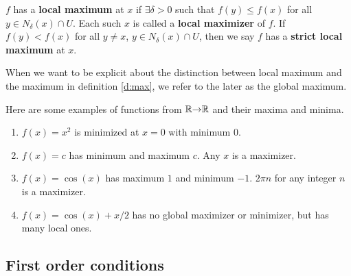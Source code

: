 \begin{definition}\label{d:lmax}
  $f$ has a \textbf{local maximum} at $x$ if $\exists \delta > 0$ such
  that $f(y) \leq f(x)$ for all $y \in  N_\delta(x) \cap U$. Each such
  $x$ is called a \textbf{local maximizer} of $f$. If $f(y) < f(x)$
  for all $y \neq x$, $y \in N_\delta(x) \cap U$, then we say $f$ has
  a \textbf{strict local maximum} at $x$.
\end{definition}
When we want to be explicit about the distinction between local
maximum and the maximum in definition \ref{d:max}, we refer to the
later as the global maximum.  
\begin{example}
  Here are some examples of functions from $\mathbb{R} {\rightarrow} \mathbb{R}$ and their
  maxima and minima.
  \begin{enumerate}
  \item $f(x) = x^2$ is minimized at $x = 0$ with minimum $0$. 
  \item $f(x) = c$ has minimum and maximum $c$. Any $x$ is a
    maximizer.
  \item $f(x) = \cos(x)$ has maximum $1$ and minimum $-1$. $2\pi n$
    for any integer $n$ is a maximizer. 
  \item $f(x) = \cos(x) + x/2$ has no global maximizer or minimizer,
    but has many local ones.
  \end{enumerate}
\end{example}

\subsection{First order conditions}


